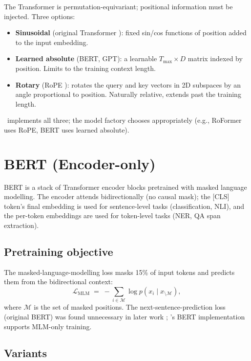 The Transformer is permutation-equivariant; positional
information must be injected. Three options:

\begin{itemize}
  \item \textbf{Sinusoidal} (original Transformer
    \cite{vaswani_attention_2017}): fixed sin/cos functions of
    position added to the input embedding.
  \item \textbf{Learned absolute} (BERT, GPT): a learnable
    $T_{\max} \times D$ matrix indexed by position. Limits to
    the training context length.
  \item \textbf{Rotary} (RoPE \cite{su_roformer_2021}): rotates
    the query and key vectors in 2D subspaces by an angle
    proportional to position. Naturally relative, extends past
    the training length.
\end{itemize}

\Lucid\ implements all three; the model factory chooses
appropriately (e.g., RoFormer uses RoPE, BERT uses learned
absolute).

\section{BERT (Encoder-only)}
\label{sec:language_models:bert}

BERT \cite{devlin_bert_2019} is a stack of Transformer encoder
blocks pretrained with masked language modelling. The encoder
attends bidirectionally (no causal mask); the [CLS] token's
final embedding is used for sentence-level tasks (classification,
NLI), and the per-token embeddings are used for token-level
tasks (NER, QA span extraction).

\subsection{Pretraining objective}
\label{ssec:language_models:bert_pretrain}

The masked-language-modelling loss masks 15\% of input tokens
and predicts them from the bidirectional context:
\[
  \mathcal{L}_{\text{MLM}} \;=\; -\sum_{i \in \mathcal{M}} \log p(x_i \mid x_{\setminus \mathcal{M}}),
\]
where $\mathcal{M}$ is the set of masked positions.
The next-sentence-prediction loss (original BERT) was found
unnecessary in later work \cite{liu_roberta_2019}; \Lucid's BERT
implementation supports MLM-only training.

\subsection{Variants}
\label{ssec:language_models:bert_variants}

